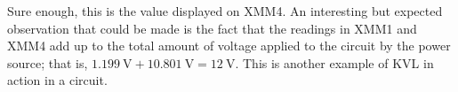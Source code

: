 \documentclass{article}
\begin{document}
Sure enough, this is the value displayed on XMM4.
An interesting but expected observation that could be made
is the fact that the readings in XMM1 and XMM4 add up to
the total amount of voltage applied to the circuit by the
power source; that is,
$\SI{1.199}{\volt} + \SI{10.801}{\volt} = \SI{12}{\volt}$.
This is another example of KVL in action in a circuit.
\end{document}
